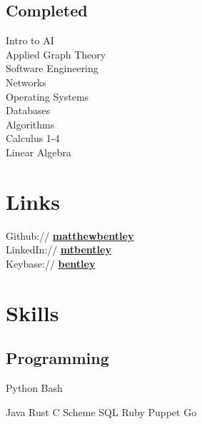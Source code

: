 \documentclass[letterpaper]{deedy-resume} %
\newcommand{\bul}{\textbullet{}}
\begin{document}
\begin{minipage}[t]{0.33\textwidth}
\subsection{Completed}

Intro to AI \\%
Applied Graph Theory \\%
Software Engineering \\%
Networks \\%
Operating Systems \\%
Databases \\%
Algorithms \\%
Calculus 1-4 \\%
Linear Algebra


\sectionspace %


\section{Links}

Github:// \href{https://github.com/matthewbentley}{\bf matthewbentley} \\
LinkedIn:// \href{https://www.linkedin.com/in/mtbentley}{\bf mtbentley} \\
Keybase:// \href{https://keybase.io/bentley}{\bf bentley} \\

\sectionspace %


\section{Skills}

\subsection{Programming}


Python \bul Bash


Java \bul Rust \bul C \bul Scheme \bul SQL \bul Ruby \bul Puppet \bul Go



\end{minipage}
\end{document}
